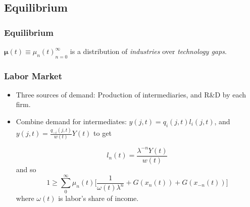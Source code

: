 \documentclass{beamer}
\begin{document}



\subsection{Equilibrium}
\label{sub:equilibrium}
\begin{frame}[t]\frametitle{Equilibrium} 

  $\bm{\mu}(t) \equiv {\mu_n(t)}_{n=0}^\infty$ is a distribution of \emph{industries} over \emph{technology gaps}.
  

\end{frame}

\begin{frame}[t]\frametitle{Labor Market} 
  \begin{itemize}
    \item<+-> Three sources of demand: Production of intermediaries, and R\&D by each firm.
    \item<+-> Combine demand for intermediates: $y(j, t) = q_i(j, t)l_i(j, t)$, and $y(j, t) = \frac{q_{-i}(j, t)}{w(t)}Y(t)$ to get

      \begin{equation}
        l_n(t) = \frac{\lambda^{-n}Y(t)}{w(t)}
      \end{equation}
    and so
      \begin{equation} \label{eq:labor_clearing}
        1 \geq \sum_0^{\infty} \mu_n(t) \Big[\frac{1}{\omega(t)\lambda^n} + G(x_n(t))    + G(x_{-n}(t))\Big]
      \end{equation}
      where $\omega(t)$ is labor's share of income.

  \end{itemize}
\end{frame}
\end{document}

